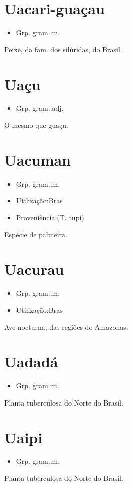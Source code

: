 \documentclass{article}
\begin{document}
\section{Uacari-guaçau}
\begin{itemize}
\item {Grp. gram.:m.}
\end{itemize}
Peixe, da fam. dos silúridas, do Brasil.
\section{Uaçu}
\begin{itemize}
\item {Grp. gram.:adj.}
\end{itemize}
O mesmo que \textunderscore guaçu\textunderscore .
\section{Uacuman}
\begin{itemize}
\item {Grp. gram.:m.}
\end{itemize}
\begin{itemize}
\item {Utilização:Bras}
\end{itemize}
\begin{itemize}
\item {Proveniência:(T. tupi)}
\end{itemize}
Espécie de palmeira.
\section{Uacurau}
\begin{itemize}
\item {Grp. gram.:m.}
\end{itemize}
\begin{itemize}
\item {Utilização:Bras}
\end{itemize}
Ave nocturna, das regiões do Amazonas.
\section{Uadadá}
\begin{itemize}
\item {Grp. gram.:m.}
\end{itemize}
Planta tuberculosa do Norte do Brasil.
\section{Uaipi}
\begin{itemize}
\item {Grp. gram.:m.}
\end{itemize}
Planta tuberculosa do Norte do Brasil.
\end{document}
